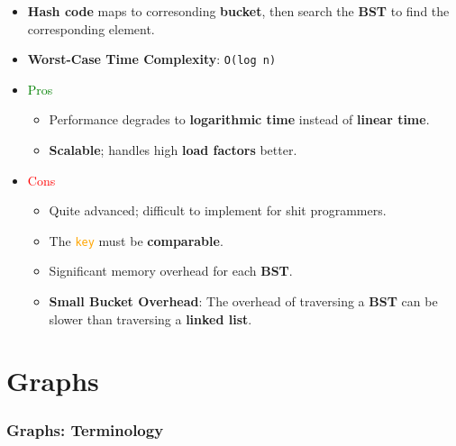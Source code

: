 \documentclass[12pt, letterpaper]{article}
\begin{document}
\begin{itemize}
    \item \textbf{Hash code} maps to corresonding \textbf{bucket}, then search the \textbf{BST} to find the corresponding element.
    \item \textbf{Worst-Case Time Complexity}: \texttt{O(log n)}
    \item \textcolor{green}{Pros}
        \begin{itemize}
            \item Performance degrades to \textbf{logarithmic time} instead of \textbf{linear time}.
            \item \textbf{Scalable}; handles high \textbf{load factors} better.
        \end{itemize}
    \item \textcolor{red}{Cons}
        \begin{itemize}
            \item Quite advanced; difficult to implement for shit programmers.
            \item The \texttt{\textcolor{orange}{key}} must be \textbf{comparable}.
            \item Significant memory overhead for each \textbf{BST}.
            \item \textbf{Small Bucket Overhead}: The overhead of traversing a \textbf{BST} can be slower than traversing a \textbf{linked list}.
        \end{itemize}
\end{itemize}

\part{Graphs}

\section*{Graphs: Terminology}
\end{document}
